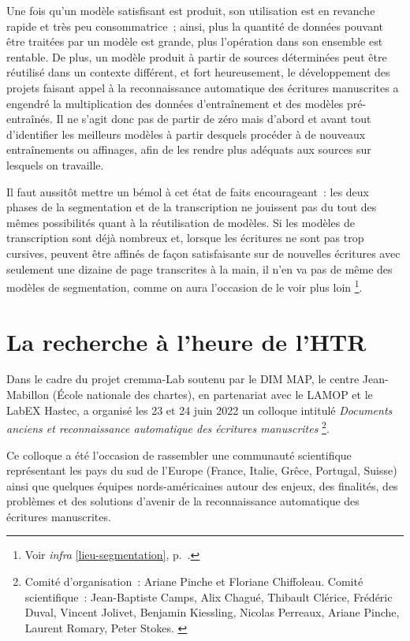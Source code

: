 \documentclass[a4paper,12pt,twoside]{book}
\begin{document}
			Une fois qu'un modèle satisfisant est produit, son utilisation est en revanche rapide et très peu consommatrice~; ainsi, plus la quantité de données pouvant être traitées par un modèle est grande, plus l'opération dans son ensemble est rentable. De plus, un modèle produit à partir de sources déterminées peut être réutilisé dans un contexte différent, et fort heureusement, le développement des projets faisant appel à la reconnaissance automatique des écritures manuscrites a engendré la multiplication des données d'entraînement et des modèles pré-entraînés. Il ne s'agit donc pas de partir de zéro mais d'abord et avant tout d'identifier les meilleurs modèles à partir desquels procéder à de nouveaux entraînements ou affinages, afin de les rendre plus adéquats aux sources sur lesquels on travaille.
			
			Il faut aussitôt mettre un bémol à cet état de faits encourageant~: les deux phases de la \gls{segmentation} et de la transcription ne jouissent pas du tout des mêmes possibilités quant à la réutilisation de modèles. Si les modèles de transcription sont déjà nombreux et, lorsque les écritures ne sont pas trop cursives, peuvent être affinés de façon satisfaisante sur de nouvelles écritures avec seulement une dizaine de page transcrites à la main, il n'en va pas de même des modèles de \gls{segmentation}, comme on aura l'occasion de le voir plus loin
			\footnote{Voir \textit{infra} \ref{lieu-segmentation}, p.~\pageref{lieu-segmentation}.}.
		
		\section{La recherche à l'heure de l'HTR}
		
			Dans le cadre du projet \gls{cremma}-Lab soutenu par le DIM MAP, le centre
			Jean-Mabillon (École nationale des chartes), en partenariat avec le
			LAMOP et le LabEX Hastec, a organisé les 23 et 24 juin 2022 un colloque
			intitulé \textit{Documents anciens et reconnaissance automatique des écritures manuscrites}
			\footnote{Comité d'organisation~: Ariane Pinche et Floriane Chiffoleau. Comité scientifique~: Jean-Baptiste Camps, Alix Chagué, Thibault Clérice, Frédéric Duval, Vincent Jolivet, Benjamin Kiessling, Nicolas Perreaux, Ariane Pinche, Laurent Romary, Peter Stokes. \cite{DocumentsAnciensReconnaissance}}.
			
			Ce colloque a été l'occasion de rassembler une communauté scientifique
			représentant les pays du sud de l'Europe (France, Italie, Grêce,
			Portugal, Suisse) ainsi que quelques équipes nords-américaines autour
			des enjeux, des finalités, des problèmes et des solutions d'avenir de la
			reconnaissance automatique des écritures manuscrites.
			
\end{document}
